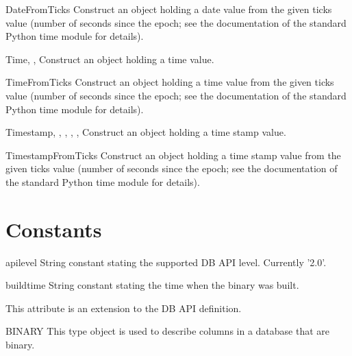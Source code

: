 \documentclass{manual}
\begin{document}
\begin{funcdesc}{DateFromTicks}{}
  Construct an object holding a date value from the given ticks value (number
  of seconds since the epoch; see the documentation of the standard Python
  time module for details).
\end{funcdesc}

\begin{funcdesc}{Time}{, , }
  Construct an object holding a time value.
\end{funcdesc}

\begin{funcdesc}{TimeFromTicks}{}
  Construct an object holding a time value from the given ticks value (number
  of seconds since the epoch; see the documentation of the standard Python
  time module for details).
\end{funcdesc}

\begin{funcdesc}{Timestamp}{, , ,
    , , }
  Construct an object holding a time stamp value.
\end{funcdesc}

\begin{funcdesc}{TimestampFromTicks}{}
  Construct an object holding a time stamp value from the given ticks value
  (number of seconds since the epoch; see the documentation of the standard
  Python time module for details).
\end{funcdesc}

\section{Constants}\label{constants}

\begin{datadesc}{apilevel}
  String constant stating the supported DB API level. Currently '2.0'.
\end{datadesc}

\begin{datadesc}{buildtime}
  String constant stating the time when the binary was built.

   This attribute is an extension to the DB API definition.
\end{datadesc}

\begin{datadesc}{BINARY}
  This type object is used to describe columns in a database that are binary.
\end{datadesc}
\end{document}
